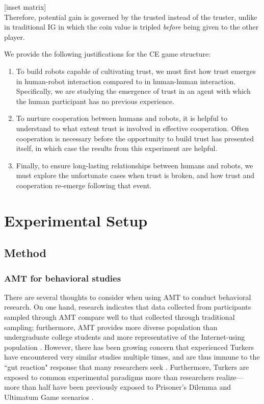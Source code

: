 \documentclass{sig-alternate}
\begin{document}
[inset matrix]\\

Therefore, potential gain is governed by the trusted instead of the truster, unlike in traditional IG in which the coin value is tripled \textit{before} being given to the other player. 

We provide the following justifications for the CE game structure:

\begin{enumerate}
\item To build robots capable of cultivating trust, we must first how trust emerges in human-robot interaction compared to in human-human interaction. Specifically, we are studying the emergence of trust in an agent with which the human participant has no previous experience.
\item To nurture cooperation between humans and robots, it is helpful to understand to what extent trust is involved in effective cooperation. Often cooperation is necessary before the opportunity to build trust has presented itself, in which case the results from this experiment are helpful.
\item Finally, to ensure long-lasting relationships between humans and robots, we must explore the unfortunate cases when trust is broken, and how trust and cooperation re-emerge following that event.
\end{enumerate}


\section{Experimental Setup}
\subsection{Method}
\subsubsection{AMT for behavioral studies} 
There are several thoughts to consider when using AMT to conduct behavioral research. On one hand, research indicates that data collected from participants sampled through AMT compare well to that collected through traditional sampling; furthermore, AMT provides more diverse population than undergraduate college students and more representative of the Internet-using population \cite{crump2013evaluating} \cite{mason2012conducting}. However, there has been growing concern that experienced Turkers have encountered very similar studies multiple times, and are thus immune to the ``gut reaction" response that many researchers seek \cite{chandler2014nonnaivete}. Furthermore, Turkers are exposed to common experimental paradigms more than researchers realize--- more than half have been previously exposed to Prisoner's Dilemma and Ultimatum Game scenarios \cite{chandler2014nonnaivete}.
\end{document}
